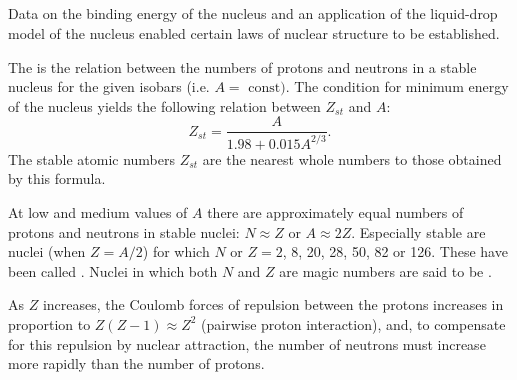 \subsection{}\label{42.2.5} Data on the binding energy of the nucleus and an application of the liquid-drop model of the nucleus enabled certain laws of nuclear structure to be established.



The  is the relation between the numbers of protons and neutrons in a stable nucleus for the given isobars  (i.e. $A = \text{ const})$. The condition for minimum energy of the nucleus yields the following relation between $Z_{st}$ and $A$:
\begin{equation*}%
Z_{st} = \frac{A}{ 1.98 + 0.015A^{2/3}}.
\end{equation*}
The stable atomic numbers $Z_{st}$ are the nearest whole numbers to those obtained by this formula. 

At low and medium values of $A$ there are approximately equal numbers of protons and neutrons in stable nuclei: $N \approx Z$ or $A \approx 2Z$. Especially stable are nuclei (when $Z = A/2$) for which $N$ or $Z = 2$, 8, 20, 28, 50, 82 or 126. These have been called . Nuclei in which both $N$ and $Z$ are magic numbers are said to be .

As $Z$ increases, the Coulomb forces of repulsion between the protons increases in proportion to $Z (Z - 1) \approx Z^{2}$ (pairwise proton interaction), and, to compensate for this repulsion by nuclear attraction, the number of neutrons must increase more rapidly than the number of protons.

